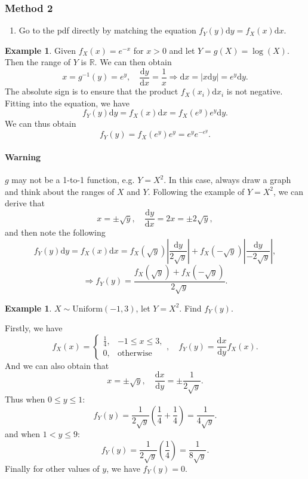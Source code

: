 \documentclass[12pt]{report}
\theoremstyle{definition}
\begin{document}
\subsubsection{Method 2}
\begin{enumerate}
    \item Go to the pdf directly by matching the equation
        $f_Y(y)\mathrm{d}y=f_X(x)\mathrm{d}x$.
\end{enumerate} 
\newtheorem{transform using pdf directly}[theorem]{Example}
\begin{transform using pdf directly}
    Given $f_X(x)=e^{-x}$ for $x>0$ and let $Y=g(X)=\log(X)$.
    Then the range of $Y$ is $\mathbb{R}$. We can then obtain
    \[
        x=g^{-1}(y)=e^{y},\quad
        \frac{\mathrm{d}y}{\mathrm{d}x}=\frac{1}{x}\Rightarrow
        \mathrm{d}x=|x\mathrm{d}y|=e^{y}\mathrm{d}y.
    \]
    The absolute sign is to ensure that the product $f_X(x_i)\mathrm{d}x_i$ is
    not negative.
    Fitting into the equation, we have
    \[
        f_Y(y)\mathrm{d}y=f_X(x)\mathrm{d}x
        =f_X(e^{y})e^{y}\mathrm{d}y.
    \]
    We can thus obtain
    \[
        f_Y(y)=f_X(e^{y})e^{y}=e^{y}e^{-e^{y}}.
    \]
\end{transform using pdf directly}

\paragraph{Warning}
$g$ may not be a 1-to-1 function, e.g. $Y=X^{2}$.
In this case, always draw a graph and think about the ranges of $X$ and $Y$.
Following the example of $Y=X^{2}$, we can derive that
\[
    x=\pm\sqrt{y},\quad \frac{\mathrm{d}y}{\mathrm{d}x}=2x=\pm 2\sqrt{y},
\]
and then note the following
\[
    f_Y(y)\mathrm{d}y=f_X(x)\mathrm{d}x
    =f_X(\sqrt{y})\left|\frac{\mathrm{d}y}{2\sqrt{y}}\right|
    +f_X(-\sqrt{y})\left|\frac{\mathrm{d}y}{-2\sqrt{y}}\right|,
\]
\[
    \Rightarrow f_Y(y)=\frac{f_X(\sqrt{y})+f_X(-\sqrt{y})}{2\sqrt{y}}.
\]

\newtheorem{transformation directly on f_X eg2}[theorem]{Example}
\begin{transformation directly on f_X eg2}
    $X\sim\text{Uniform}(-1,3)$, let $Y=X^{2}$. Find $f_Y(y)$.

    \medskip
    Firstly, we have
    \[
        f_X(x)=
        \begin{cases}
            \frac{1}{4}, & -1\le x \le 3, \\
            0, & \text{otherwise}
        \end{cases},\quad
        f_Y(y)=\frac{\mathrm{d}x}{\mathrm{d}y}f_X(x).
    \]
    And we can also obtain that
    \[
        x=\pm\sqrt{y},\quad \frac{\mathrm{d}x}{\mathrm{d}y}
        =\pm \frac{1}{2\sqrt{y}}.
    \]
    Thus when $0\le y\le 1$:
    \[
        f_Y(y)=\frac{1}{2\sqrt{y}}\left(\frac{1}{4}+\frac{1}{4}\right)
        =\frac{1}{4\sqrt{y}}.
    \]
    and when $1<y\le 9$:
    \[
        f_Y(y)=\frac{1}{2\sqrt{y}}\left(\frac{1}{4}\right)=\frac{1}{8\sqrt{y}}.
    \]
    Finally for other values of $y$, we have $f_Y(y)=0$.
\end{transformation directly on f_X eg2}
\end{document}
